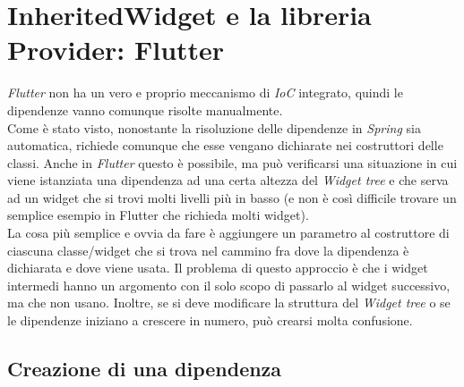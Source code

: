 \section{InheritedWidget e la libreria Provider: Flutter}
\label{sec:inheritedwidget-provider}

\emph{Flutter} non ha un vero e proprio meccanismo di \emph{IoC} integrato, quindi le dipendenze vanno comunque risolte manualmente.\\
Come è stato visto, nonostante la risoluzione delle dipendenze in \emph{Spring} sia automatica, richiede comunque che esse vengano dichiarate nei costruttori delle classi.
Anche in \emph{Flutter} questo è possibile, ma può verificarsi una situazione in cui viene istanziata una dipendenza ad una certa altezza del \emph{Widget tree} e che serva ad un widget che si trovi molti livelli più in basso (e non è così difficile trovare un semplice esempio in Flutter che richieda molti widget).\\
La cosa più semplice e ovvia da fare è aggiungere un parametro al costruttore di ciascuna classe/widget che si trova nel cammino fra dove la dipendenza è dichiarata e dove viene usata.
Il problema di questo approccio è che i widget intermedi hanno un argomento con il solo scopo di passarlo al widget successivo, ma che non usano.
Inoltre, se si deve modificare la struttura del \emph{Widget tree} o se le dipendenze iniziano a crescere in numero, può crearsi molta confusione.

\subsection{Creazione di una dipendenza}
\label{subsec:creazione-dipendenza-flutter}

